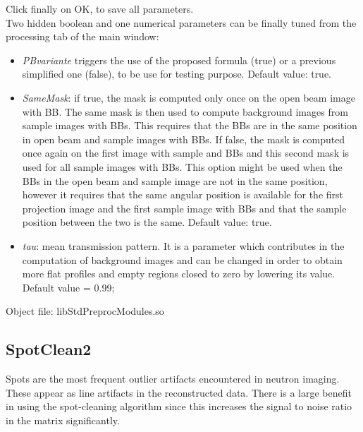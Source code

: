 \documentclass[a4paper]{scrreprt}
\begin{document}
Click finally on OK, to save all parameters. \\
Two hidden boolean and one numerical parameters can be finally tuned from the processing tab of the main window:
\begin{itemize}
\item \textit{PBvariante} triggers the use of the proposed formula (true) or a previous simplified one (false), to be use for testing purpose. Default value: true.
\item \textit{SameMask}: if true, the mask is computed only once on the open beam image with BB. The same mask is then used to compute background images from sample images with BBs. This requires that the BBs are in the same position in open beam and sample images with BBs. If false, the mask is computed once again on the first image with sample and BBs and this second mask is used for all sample images with BBs. This option might be used when the BBs in the open beam and sample image are not in the same position, however it requires that the same angular position is available for the first projection image and the first sample image with BBs and that the sample position between the two is the same. Default value: true.  
\item \textit{tau}: mean transmission pattern. It is a parameter which contributes in the computation of background images and can be changed in order to obtain more flat profiles and empty regions closed to zero by lowering its value. Default value = 0.99;
\end{itemize}


  
Object file: libStdPreprocModules.so


\subsection{SpotClean2}
Spots are the most frequent outlier artifacts encountered in neutron imaging. These appear as line artifacts in the reconstructed data. There is a large benefit in using the spot-cleaning algorithm since this increases the signal to
noise ratio in the matrix significantly.
\end{document}
